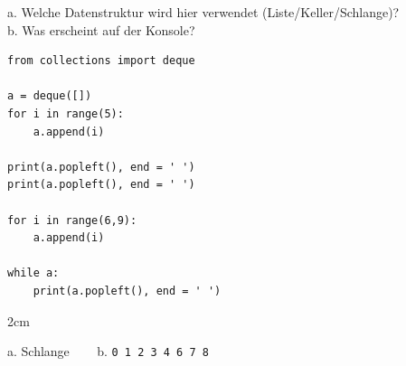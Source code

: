 \question[2]
a. Welche Datenstruktur wird hier verwendet (Liste/Keller/Schlange)? \\
b. Was erscheint auf der Konsole?
 
\begin{lstlisting}
from collections import deque
 
a = deque([])   
for i in range(5):
    a.append(i)

print(a.popleft(), end = ' ')
print(a.popleft(), end = ' ')

for i in range(6,9):
    a.append(i)

while a:
    print(a.popleft(), end = ' ')
\end{lstlisting}

\begin{solutionbox}{2cm}
 
a. Schlange ~~~ b. \texttt{0 1 2 3 4 6 7 8}
\end{solutionbox}
